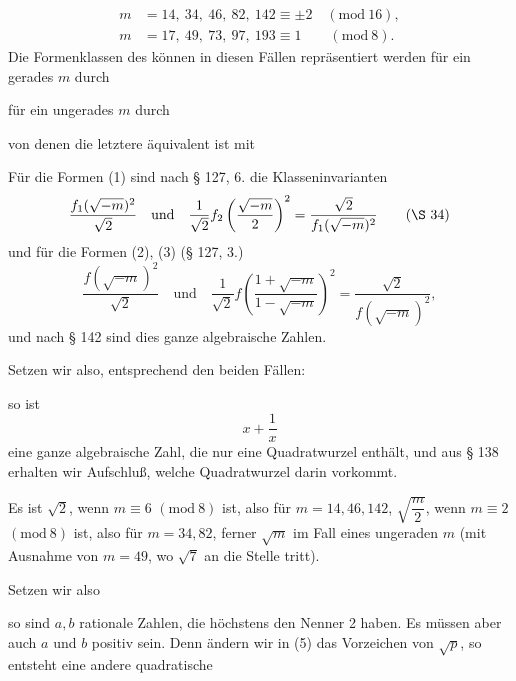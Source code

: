 \[
\begin{aligned}
m &= 14,\ 34,\ 46,\ 82,\ 142 \equiv \pm2 \quad (\mathrm{mod}\ 16),\\
m &= 17,\ 49,\ 73,\ 97,\ 193 \equiv 1 \qquad (\mathrm{mod}\ 8).
\end{aligned}
\]
Die Formenklassen des  können in diesen Fällen repräsentiert werden für ein gerades $m$ durch


für ein ungerades $m$ durch


von denen die letztere äquivalent ist mit


Für die Formen (1) sind nach § 127, 6. die Klasseninvarianten
\[
\frac{f_1(\sqrt{-m})^2}{\sqrt2} \quad \text{und} \quad \frac{1}{\sqrt2} f_2\left(\frac{\sqrt{-m}}{2}\right)^2 = \frac{\sqrt2}{f_1(\sqrt{-m})^2} \qquad (\S\ 34)
\]
und für die Formen (2), (3) (§ 127, 3.)
\[
\frac{f(\sqrt{-m})^2}{\sqrt2} \quad \text{und} \quad \frac{1}{\sqrt2} f\left(\frac{1+\sqrt{-m}}{1-\sqrt{-m}}\right)^2 = \frac{\sqrt2}{f(\sqrt{-m})^2},
\]
und nach § 142 sind dies ganze algebraische Zahlen.

Setzen wir also, entsprechend den beiden Fällen:


so ist
\[
x + \frac{1}{x}
\]
eine ganze algebraische Zahl, die nur eine Quadratwurzel enthält, und aus § 138 erhalten wir Aufschluß, welche Quadratwurzel darin vorkommt.

Es ist $\sqrt2$, wenn $m \equiv 6$ $(\mathrm{mod}\ 8)$ ist, also für $m = 14, 46, 142$, $\sqrt{\dfrac{m}{2}}$, wenn $m \equiv 2$ $(\mathrm{mod}\ 8)$ ist, also für $m = 34, 82$, ferner $\sqrt m$ im Fall eines ungeraden $m$ (mit Ausnahme von $m = 49$, wo $\sqrt7$ an die Stelle tritt).

Setzen wir also


so sind $a, b$ rationale Zahlen, die höchstens den Nenner 2 haben. Es müssen aber auch $a$ und $b$ positiv sein. Denn ändern wir in (5) das Vorzeichen von $\sqrt p$, so entsteht eine andere quadratische
